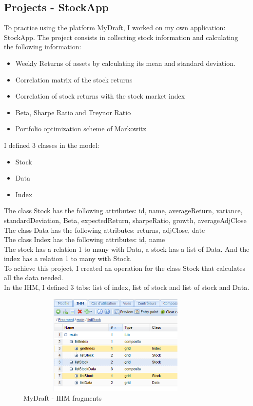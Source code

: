 \documentclass{report}
\begin{document}
\subsection{Projects - StockApp}
To practice using the platform MyDraft, I worked on my own application: StockApp. The project consists in collecting stock information and calculating the following information: 
\begin{itemize}
\item Weekly Returns of assets by calculating its mean and standard deviation. 
\item Correlation matrix of the stock returns
\item Correlation of stock returns with the stock market index
\item Beta, Sharpe Ratio and Treynor Ratio
\item Portfolio optimization scheme of Markowitz
\end{itemize}
I defined 3 classes in the model: 
\begin{itemize}
\item Stock
\item Data
\item Index
\end{itemize}
The class Stock has the following attributes: id, name, averageReturn, variance, standardDeviation, Beta, expectedReturn, sharpeRatio, growth, averageAdjClose\\
The class Data has the following attributes: returns, adjClose, date \\
The class Index has the following attributes: id, name\\
The stock has a relation 1 to many with Data, a stock has a list of Data. And the index has a relation 1 to many with Stock. \\
To achieve this project, I created an operation for the class Stock that calculates all the data needed.\\

In the IHM, I defined 3 tabs: list of index, list of stock and list of stock and Data.
\begin{figure}[H]
\centering
\includegraphics[width=10cm,height=5cm,keepaspectratio]{ihm.png}
\caption{MyDraft - IHM fragments}
\end{figure}
\end{document}
